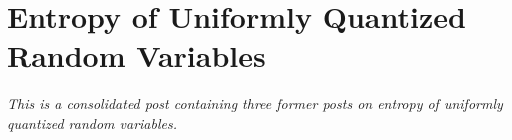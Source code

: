 \section{Entropy of Uniformly Quantized Random Variables}

\emph{This is a consolidated post containing three former posts on entropy of uniformly quantized random variables.}




